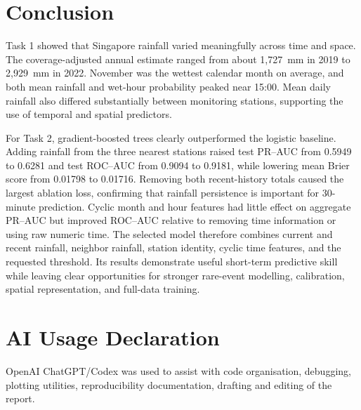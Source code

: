 \documentclass[11pt]{article}
\begin{document}
\section{Conclusion}

Task 1 showed that Singapore rainfall varied meaningfully across time and
space. The coverage-adjusted annual estimate ranged from about 1,727~mm in
2019 to 2,929~mm in 2022. November was the wettest calendar month on average,
and both mean rainfall and wet-hour probability peaked near 15:00. Mean daily
rainfall also differed substantially between monitoring stations, supporting
the use of temporal and spatial predictors.

For Task 2, gradient-boosted trees clearly outperformed the logistic baseline.
Adding rainfall from the three nearest stations raised test PR--AUC from
0.5949 to 0.6281 and test ROC--AUC from 0.9094 to 0.9181, while lowering mean
Brier score from 0.01798 to 0.01716. Removing both recent-history totals caused
the largest ablation loss, confirming that rainfall persistence is important
for 30-minute prediction. Cyclic month and hour features had little effect on
aggregate PR--AUC but improved ROC--AUC relative to removing time information
or using raw numeric time. The selected model therefore combines current and
recent rainfall, neighbor rainfall, station identity, cyclic time features,
and the requested threshold. Its results demonstrate useful short-term
predictive skill while leaving clear opportunities for stronger rare-event
modelling, calibration, spatial representation, and full-data training.

\section{AI Usage Declaration}

OpenAI ChatGPT/Codex was used to assist with code organisation, debugging,
plotting utilities, reproducibility documentation, drafting and editing of the
report.
\end{document}
